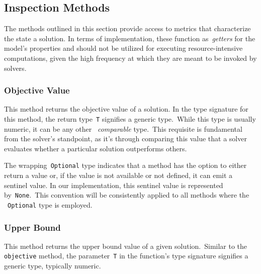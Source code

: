 \subsection{Inspection Methods}

The methods outlined in this section provide access to metrics that characterize
the state a solution. In terms of implementation, these function
as~\emph{getters} for the model's properties and should not be utilized for
executing resource-intensive computations, given the high frequency at which
they are meant to be invoked by solvers.

\subsubsection*{Objective Value}

\begin{center}
\end{center}

This method returns the objective value of a solution. In the type signature for
this method, the return type~\texttt{T} signifies a generic type.~While this
type is usually numeric, it can be any other ~\emph{comparable} type.~This
requisite is fundamental from the solver's standpoint, as it's through comparing
this value that a solver evaluates whether a particular solution outperforms
others.

The wrapping~\texttt{Optional} type indicates that a method has the option to
either return a value or, if the value is not available or not defined, it can
emit a sentinel value. In our implementation, this sentinel value is represented
by~\texttt{None}.~This convention will be consistently applied to all methods
where the ~\texttt{Optional} type is employed.

\subsubsection*{Upper Bound}

\begin{center}
\end{center}

This method returns the upper bound value of a given solution.~Similar to the
\texttt{objective} method, the parameter~\texttt{T} in the function's type
signature signifies a generic type, typically numeric.

